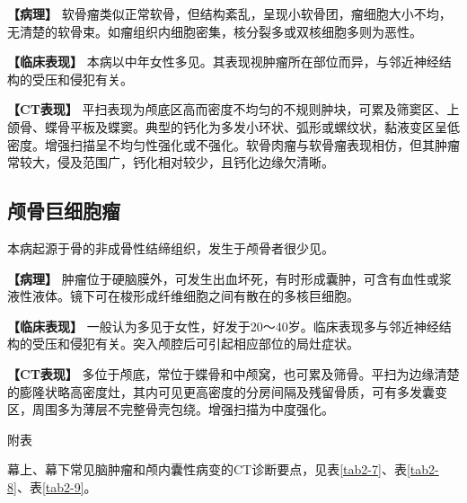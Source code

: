 \textbf{【病理】}
软骨瘤类似正常软骨，但结构紊乱，呈现小软骨团，瘤细胞大小不均，无清楚的软骨束。如瘤组织内细胞密集，核分裂多或双核细胞多则为恶性。

\textbf{【临床表现】}
本病以中年女性多见。其表现视肿瘤所在部位而异，与邻近神经结构的受压和侵犯有关。

\textbf{【CT表现】}
平扫表现为颅底区高而密度不均匀的不规则肿块，可累及筛窦区、上颌骨、蝶骨平板及蝶窦。典型的钙化为多发小环状、弧形或螺纹状，黏液变区呈低密度。增强扫描呈不均匀性强化或不强化。软骨肉瘤与软骨瘤表现相仿，但其肿瘤常较大，侵及范围广，钙化相对较少，且钙化边缘欠清晰。

\subsection{颅骨巨细胞瘤}

本病起源于骨的非成骨性结缔组织，发生于颅骨者很少见。

\textbf{【病理】}
肿瘤位于硬脑膜外，可发生出血坏死，有时形成囊肿，可含有血性或浆液性液体。镜下可在梭形成纤维细胞之间有散在的多核巨细胞。

\textbf{【临床表现】}
一般认为多见于女性，好发于20～40岁。临床表现多与邻近神经结构的受压和侵犯有关。突入颅腔后可引起相应部位的局灶症状。

\textbf{【CT表现】}
多位于颅底，常位于蝶骨和中颅窝，也可累及筛骨。平扫为边缘清楚的膨隆状略高密度灶，其内可见更高密度的分房间隔及残留骨质，可有多发囊变区，周围多为薄层不完整骨壳包绕。增强扫描为中度强化。

附表

幕上、幕下常见脑肿瘤和颅内囊性病变的CT诊断要点，见表\ref{tab2-7}、表\ref{tab2-8}、表\ref{tab2-9}。

